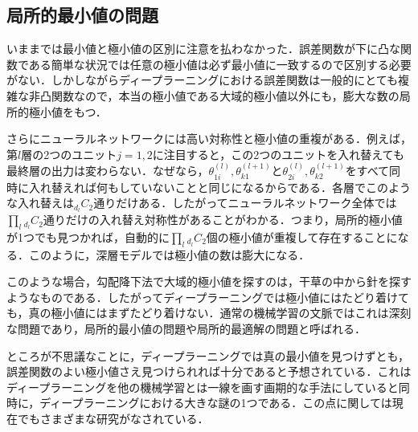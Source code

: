 \documentclass[a4paper,11pt]{jsreport}
\begin{document}
\subsection{局所的最小値の問題}
いままでは最小値と極小値の区別に注意を払わなかった．誤差関数が下に凸な関数である簡単な状況では任意の極小値は必ず最小値に一致するので区別する必要がない．しかしながらディープラーニングにおける誤差関数は一般的にとても複雑な非凸関数なので，本当の極小値である大域的極小値以外にも，膨大な数の局所的極小値をもつ．\par
さらにニューラルネットワークには高い対称性と極小値の重複がある．例えば，第$l$層の2つのユニット$j=1,2$に注目すると，この2つのユニットを入れ替えても最終層の出力は変わらない．なぜなら，$\theta_{1i}^{(l)},\theta_{k1}^{(l+1)}$と$\theta_{2i}^{(l)},\theta_{k2}^{(l+1)}$をすべて同時に入れ替えれば何もしていないことと同じになるからである．各層でこのような入れ替えは${}_{d_l} C_2$通りだけある．したがってニューラルネットワーク全体では$\prod_l {}_{d_l} C_2$通りだけの入れ替え対称性があることがわかる．つまり，局所的極小値が1つでも見つかれば，自動的に$\prod_l {}_{d_l} C_2$個の極小値が重複して存在することになる．このように，深層モデルでは極小値の数は膨大になる．\par
このような場合，勾配降下法で大域的極小値を探すのは，干草の中から針を探すようなものである．したがってディープラーニングでは極小値にはたどり着けても，真の極小値にはまずたどり着けない．通常の機械学習の文脈ではこれは深刻な問題であり，局所的最小値の問題や局所的最適解の問題と呼ばれる．\par
ところが不思議なことに，ディープラーニングでは真の最小値を見つけずとも，誤差関数のよい極小値さえ見つけられれば十分であると予想されている．これはディープラーニングを他の機械学習とは一線を画す画期的な手法にしていると同時に，ディープラーニングにおける大きな謎の1つである．この点に関しては現在でもさまざまな研究がなされている．\par
\end{document}
